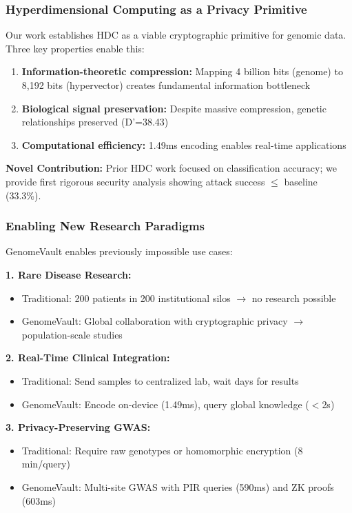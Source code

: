 \documentclass[11pt,a4paper]{article}
\begin{document}
\subsubsection{Hyperdimensional Computing as a Privacy Primitive}

Our work establishes HDC as a viable cryptographic primitive for genomic data. Three key properties enable this:

\begin{enumerate}
    \item \textbf{Information-theoretic compression:} Mapping 4 billion bits (genome) to 8,192 bits (hypervector) creates fundamental information bottleneck
    \item \textbf{Biological signal preservation:} Despite massive compression, genetic relationships preserved (D'=38.43)
    \item \textbf{Computational efficiency:} 1.49ms encoding enables real-time applications
\end{enumerate}

\textbf{Novel Contribution:} Prior HDC work focused on classification accuracy; we provide first rigorous security analysis showing attack success $\leq$ baseline (33.3\%).

\subsubsection{Enabling New Research Paradigms}

GenomeVault enables previously impossible use cases:

\textbf{1. Rare Disease Research:}
\begin{itemize}
    \item Traditional: 200 patients in 200 institutional silos $\rightarrow$ no research possible
    \item GenomeVault: Global collaboration with cryptographic privacy $\rightarrow$ population-scale studies
\end{itemize}

\textbf{2. Real-Time Clinical Integration:}
\begin{itemize}
    \item Traditional: Send samples to centralized lab, wait days for results
    \item GenomeVault: Encode on-device (1.49ms), query global knowledge ($<$2s)
\end{itemize}

\textbf{3. Privacy-Preserving GWAS:}
\begin{itemize}
    \item Traditional: Require raw genotypes or homomorphic encryption (8 min/query)
    \item GenomeVault: Multi-site GWAS with PIR queries (590ms) and ZK proofs (603ms)
\end{itemize}
\end{document}
